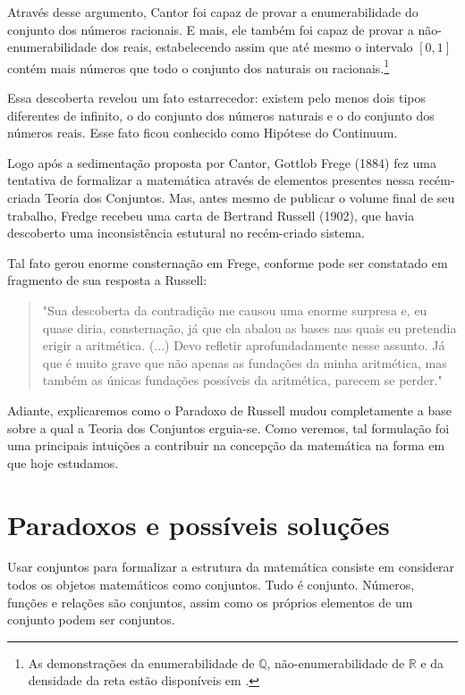 \documentclass[a4paper,10pt]{article}
\begin{document}
Através desse argumento, Cantor foi capaz de provar a enumerabilidade do conjunto dos números racionais. E mais, ele também foi capaz de provar a não-enumerabilidade dos reais, estabelecendo assim que até mesmo o intervalo $[0,1]$ contém mais números que todo o conjunto dos naturais ou racionais.\footnote{As demonstrações da enumerabilidade de $\mathbb{Q}$, não-enumerabilidade de $\mathbb{R}$ e da densidade da reta estão disponíveis em \cite{histinfinito}.}

Essa descoberta revelou um fato estarrecedor: existem pelo menos dois tipos diferentes de infinito, o do conjunto dos números naturais e o do conjunto dos números reais.\cite{rpm04} Esse fato ficou conhecido como Hipótese do Continuum.

Logo após a sedimentação proposta por Cantor, Gottlob Frege (1884) fez uma tentativa de formalizar a matemática através de elementos presentes nessa recém-criada Teoria dos Conjuntos. Mas, antes mesmo de publicar o volume final de seu trabalho, Fredge recebeu uma carta de Bertrand Russell (1902), que havia descoberto uma inconsistência estutural no recém-criado sistema.

Tal fato gerou enorme consternação em Frege, conforme pode ser constatado em fragmento de sua resposta a Russell:
\begin{quote}
"Sua descoberta da contradição me causou uma enorme surpresa e, eu quase diria, consternação, já que ela abalou as bases nas quais eu pretendia erigir a aritmética. (...) Devo refletir aprofundadamente nesse assunto. Já que é muito grave que não apenas as fundações da minha aritmética, mas também as únicas fundações possíveis da aritmética, parecem se perder."\cite{carta}
\end{quote}

Adiante, explicaremos como o Paradoxo de Russell mudou completamente a base sobre a qual a Teoria dos Conjuntos erguia-se. Como veremos, tal formulação foi uma principais intuições a contribuir na concepção da matemática na forma em que hoje estudamos.

\section{Paradoxos e possíveis soluções}

Usar conjuntos para formalizar a estrutura da matemática consiste em considerar todos os objetos matemáticos como conjuntos. Tudo é conjunto.\cite{fajardo} Números, funções e relações são conjuntos, assim como os próprios elementos de um conjunto podem ser conjuntos.
\end{document}
